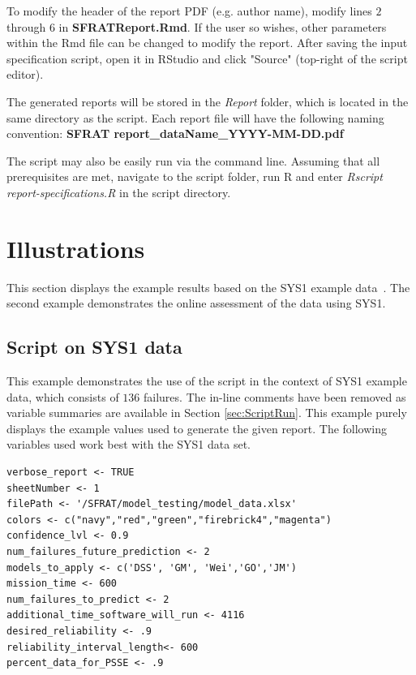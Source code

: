 \documentclass[conference]{IEEEtran}
\begin{document}
To modify the header of the report PDF (e.g. author name), modify lines $2$ through $6$ in \textbf{SFRATReport.Rmd}. If the user so wishes, other parameters within the Rmd file can be changed to modify the report. After saving the input specification script, open it in RStudio and click "Source" (top-right of the script editor).

The generated reports will be stored in the \textit{Report} folder, which is located in the same directory as the script. Each report file will have the following naming convention: 
  \newline
  \textbf{SFRAT report\_dataName\_YYYY-MM-DD.pdf}
  
The script may also be easily run via the command line. Assuming that all prerequisites are met, navigate to the script folder, run R and enter \textit{Rscript report-specifications.R} in the script directory.

\section{Illustrations}\label{sec:Ex}
This section displays the example results based on the SYS1 example data~\cite{BookHoSRE}. The second example demonstrates the online assessment of the data using SYS1.

\subsection{Script on SYS1 data}\label{sec:Ex:Script}
This example demonstrates the use of the script in the context of SYS1 example data, which consists of $136$ failures. The in-line comments have been removed as variable summaries are available in Section \ref{sec:ScriptRun}. This example purely displays the example values used to generate the given report. The following variables used work best with the SYS1 data set.
\begin{lstlisting}
verbose_report <- TRUE								
sheetNumber <- 1
filePath <- '/SFRAT/model_testing/model_data.xlsx'
colors <- c("navy","red","green","firebrick4","magenta")
confidence_lvl <- 0.9
num_failures_future_prediction <- 2	
models_to_apply <- c('DSS', 'GM', 'Wei','GO','JM')
mission_time <- 600
num_failures_to_predict <- 2
additional_time_software_will_run <- 4116
desired_reliability <- .9
reliability_interval_length<- 600
percent_data_for_PSSE <- .9
	
\end{lstlisting}
\end{document}
